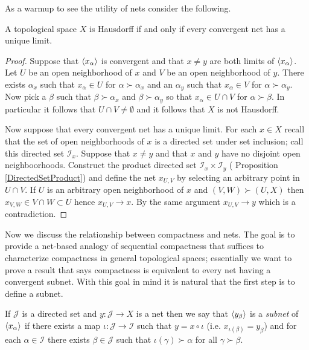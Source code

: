 As a warmup to see the utility of nets consider the following.
\begin{prop}\label{HausdorffUniqueLimits}A topological space $X$ is Hausdorff if and only if every convergent net has a unique limit.
\end{prop}
\begin{proof}
Suppose that $\langle x_{\alpha} \rangle$ is convergent and that $x \neq y$ are both limits of $\langle x_{\alpha} \rangle$.  Let $U$  be an open neighborhood of $x$ and $V$  be an open neighborhood of $y$.  There exists $\alpha_x$ such that $x_\alpha \in U$ for $\alpha \succ \alpha_x$ and an $\alpha_y$ such that $x_\alpha \in V$ for $\alpha \succ \alpha_y$.  Now pick a
$\beta$ such that $\beta \succ \alpha_x$ and $\beta \succ \alpha_y$ so that $x_\alpha \in U \cap V$ for $\alpha \succ \beta$.  In particular it follows that $U \cap V \neq \emptyset$ and it follows that $X$ is not Hausdorff.

Now suppose that every convergent net has a unique limit.  For each $x \in X$ recall that the set of open neighborhoods of $x$ is a directed set under set inclusion; call this directed set $\mathcal{I}_x$.  Suppose that $x \neq y$ and that $x$ and $y$ have no disjoint open neighboorhoods.   Construct the product directed set $\mathcal{I}_x \times \mathcal{I}_y$ ( Proposition \ref{DirectedSetProduct})  and define the net $x_{U,V}$ by selecting an arbitrary point in $U \cap V$.  If $U$ is an arbitrary open neighborhood of $x$ and $(V,W) \succ (U,X)$ then $x_{V,W} \in V \cap W \subset U$ hence $x_{U,V} \to x$.  By the same argument $x_{U,V} \to y$ which is a contradiction.
\end{proof}



Now we discuss the relationship between compactness and nets.  The goal is to provide a net-based analogy of sequential compactness that suffices to characterize compactness in general topological spaces; essentially we want to prove a result that says compactness is equivalent to every net having a convergent subnet.   With this goal in mind it is natural that the first step is to define a subnet.
\begin{defn}If $\mathcal{J}$ is a directed set and $y : \mathcal{J} \to X$ is a net then we say that $\langle y_{\beta} \rangle$ is a \emph{subnet}
of $\langle x_{\alpha} \rangle$ if there exists a map $\iota : \mathcal{J} \to \mathcal{I}$ such that $y = x \circ \iota$ (i.e. $x_{\iota(\beta)} = y_\beta$) and for each $\alpha \in \mathcal{I}$ there
exists $\beta \in \mathcal{J}$ such that $\iota(\gamma) \succ \alpha$ for all $\gamma \succ \beta$. 
\end{defn}

